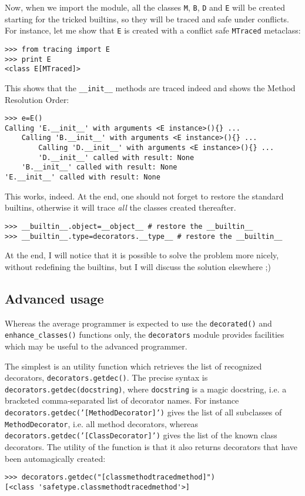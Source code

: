 \documentclass[11pt,english]{article}
\begin{document}
Now, when we import the module, all the classes \texttt{M}, \texttt{B}, \texttt{D} and \texttt{E}
will be created starting for the tricked builtins, so they will be traced
and safe under conflicts. For instance, let me show that \texttt{E} is created
with a conflict safe \texttt{MTraced} metaclass:
\begin{verbatim}>>> from tracing import E
>>> print E
<class E[MTraced]>\end{verbatim}

This shows that the \texttt{{\_}{\_}init{\_}{\_}} methods are traced indeed and shows the
Method Resolution Order:
\begin{verbatim}>>> e=E()
Calling 'E.__init__' with arguments <E instance>(){} ...
    Calling 'B.__init__' with arguments <E instance>(){} ...
        Calling 'D.__init__' with arguments <E instance>(){} ...
        'D.__init__' called with result: None
    'B.__init__' called with result: None
'E.__init__' called with result: None\end{verbatim}

This works, indeed. At the end, one should not forget to restore
the standard builtins, otherwise it will trace \emph{all} the classes
created thereafter.
\begin{verbatim}>>> __builtin__.object=__object__ # restore the __builtin__
>>> __builtin__.type=decorators.__type__ # restore the __builtin__\end{verbatim}

At the end, I will notice that it is possible to solve the problem more
nicely, without redefining the builtins, but I will discuss the solution
elsewhere ;)



\hypertarget{advanced-usage}{}
\subsection*{Advanced usage}

Whereas the average programmer is expected to use the \texttt{decorated()} 
and \texttt{enhance{\_}classes()} functions only, the \texttt{decorators} module provides 
facilities which may be useful to the advanced programmer.

The simplest is an utility function which retrieves the list of
recognized decorators, \texttt{decorators.getdec()}. The precise syntax is
\texttt{decorators.getdec(docstring)}, where \texttt{docstring}
is a magic docstring, i.e. a bracketed comma-separated list 
of decorator names. For instance \texttt{decorators.getdec('[MethodDecorator]')}
gives the list of all subclasses of \texttt{MethodDecorator}, i.e. all method
decorators, whereas \texttt{decorators.getdec('[ClassDecorator]')}
gives the list of the known class decorators. The utility of the function
is that it also returns decorators that have been automagically created:
\begin{verbatim}>>> decorators.getdec("[classmethodtracedmethod]")
[<class 'safetype.classmethodtracedmethod'>]\end{verbatim}
\end{document}
